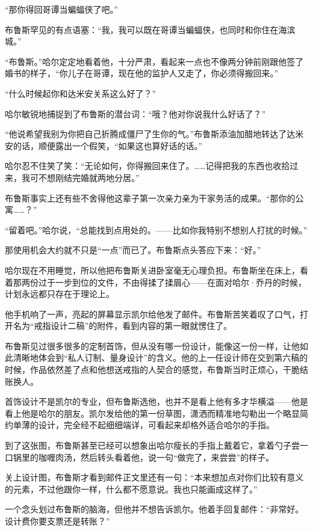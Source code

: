 \documentclass[../main]{subfiles}
\begin{document}
“那你得回哥谭当蝙蝠侠了吧。”

布鲁斯罕见的有点语塞：“我，我可以既在哥谭当蝙蝠侠，也同时和你住在海滨城。”

“布鲁斯。”哈尔定定地看着他，十分严肃，看起来一点也不像两分钟前刚跟他签了婚书的样子，“你儿子在哥谭，现在他的监护人又走了，你必须得搬回来。”

“什么时候起你和达米安关系这么好了？”

哈尔敏锐地捕捉到了布鲁斯的潜台词：“哦？他对你说我什么好话了？”

“他说希望我别为你把自己折腾成僵尸了生你的气。”布鲁斯添油加醋地转达了达米安的话，顺便露出一个假笑，“如果这也算好话的话。”

哈尔忍不住笑了笑：“无论如何，你得搬回来住了。……记得把我的东西也收拾过来，我可不想刚结完婚就两地分居。”

布鲁斯事实上还有些不舍得他这辈子第一次亲力亲为干家务活的成果。“那你的公寓……？”

“留着吧。”哈尔说，“总能找到点用处的。——比如你我特别不想别人打扰的时候。”

那使用机会大约就不只是“一点”而已了。布鲁斯点头答应下来：“好。”

哈尔现在不用睡觉，所以他把布鲁斯关进卧室毫无心理负担。布鲁斯坐在床上，看着那两份过于一步到位的文件，不由得揉了揉眉心——在面对哈尔·乔丹的时候，计划永远都只存在于理论上。

他手机响了一声，亮起的屏幕显示凯尔给他发了邮件。布鲁斯苦笑着叹了口气，打开名为“戒指设计二稿”的附件，看到内容的第一眼就愣住了。

布鲁斯见过很多很多的定制首饰，但从没有哪一份设计，能像这一份一样，让他如此清晰地体会到“私人订制、量身设计”的含义。他的上一任设计师在交到第六稿的时候，作品依然差了点和他想送戒指的人契合的感觉，布鲁斯当时正烦心，干脆结账换人。

首饰设计不是凯尔的专业，但布鲁斯选他，也并不是看上他有多才华横溢——他是看上他是哈尔的朋友。凯尔发给他的第一份草图，潇洒而精准地勾勒出一个略显简约单薄的设计，完全经不起细细端详，可看起来却格外适合哈尔的手指。

到了这张图，布鲁斯甚至已经可以想象出哈尔瘦长的手指上戴着它，拿着勺子尝一口锅里的咖喱肉汤，然后转头看着他，说一句“做完了，来尝尝”的样子。

关上设计图，布鲁斯才看到邮件正文里还有一句：“本来想加点对你们比较有意义的元素，不过他跟你一样，什么都不愿意说。我也只能画成这样了。”

一个念头划过布鲁斯的脑海，但他并不想告诉凯尔。他着手回复邮件：“非常好。设计费你要支票还是转账？”

~\
\end{document}
